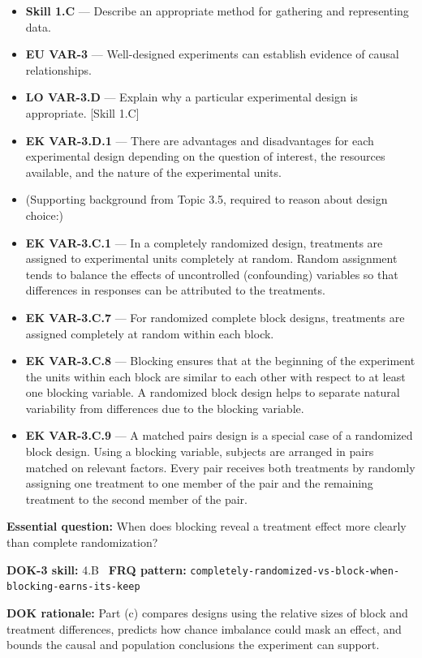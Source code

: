 \documentclass[11pt]{article}
\begin{document}


{\small
\begin{itemize}[leftmargin=1.5em,itemsep=2pt,topsep=2pt]
  \item \textbf{Skill 1.C} --- Describe an appropriate method for gathering and representing data.
  \item \textbf{EU VAR-3} --- Well-designed experiments can establish evidence of causal relationships.
  \item \textbf{LO VAR-3.D} --- Explain why a particular experimental design is appropriate. [Skill 1.C]
  \item \textbf{EK VAR-3.D.1} --- There are advantages and disadvantages for each experimental design depending on the question of interest, the resources available, and the nature of the experimental units.
  \item (Supporting background from Topic 3.5, required to reason about design choice:)
  \item \textbf{EK VAR-3.C.1} --- In a completely randomized design, treatments are assigned to experimental units completely at random. Random assignment tends to balance the effects of uncontrolled (confounding) variables so that differences in responses can be attributed to the treatments.
  \item \textbf{EK VAR-3.C.7} --- For randomized complete block designs, treatments are assigned completely at random within each block.
  \item \textbf{EK VAR-3.C.8} --- Blocking ensures that at the beginning of the experiment the units within each block are similar to each other with respect to at least one blocking variable. A randomized block design helps to separate natural variability from differences due to the blocking variable.
  \item \textbf{EK VAR-3.C.9} --- A matched pairs design is a special case of a randomized block design. Using a blocking variable, subjects are arranged in pairs matched on relevant factors. Every pair receives both treatments by randomly assigning one treatment to one member of the pair and the remaining treatment to the second member of the pair.
\end{itemize}
}
\textbf{Essential question:} When does blocking reveal a treatment effect more clearly than complete randomization?\par
\textbf{DOK-3 skill:} 4.B \textperiodcentered\ \textbf{FRQ pattern:} {\small\texttt{completely-\allowbreak{}randomized-\allowbreak{}vs-\allowbreak{}block-\allowbreak{}when-\allowbreak{}blocking-\allowbreak{}earns-\allowbreak{}its-\allowbreak{}keep}}\par
\textbf{DOK rationale:} Part (c) compares designs using the relative sizes of block and treatment differences, predicts how chance imbalance could mask an effect, and bounds the causal and population conclusions the experiment can support.\par
\end{document}
